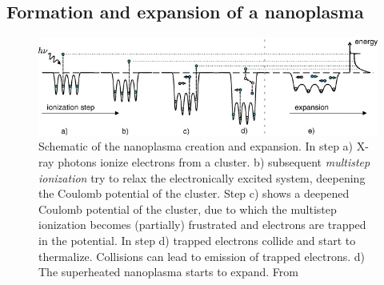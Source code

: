 \subsection{Formation and expansion of a nanoplasma}\label{sec:nanoplasma-expansion}
\begin{figure}
	\centering
		\includegraphics[width=1.00\textwidth]{images/nano-plasma-schematic.jpg}
	\caption[Schematic of the nanoplasma creation and expansion.]{Schematic of the nanoplasma creation and expansion. In step a) X-ray photons ionize electrons from a cluster. b) subsequent \textit{multistep ionization} try to relax the electronically excited system, deepening the Coulomb potential of the cluster. Step c) shows a deepened Coulomb potential of the cluster, due to which the multistep ionization becomes (partially) frustrated and electrons are trapped in the potential. In step d) trapped electrons collide and start to thermalize. Collisions can lead to emission of trapped electrons. d) The superheated nanoplasma starts to expand. From \citep[\href{https://creativecommons.org/licenses/by/3.0/}{\ccby}]{Arbeiter-2011-NJP}}
	\label{fig:nano-plasma-schematic}
\end{figure}
